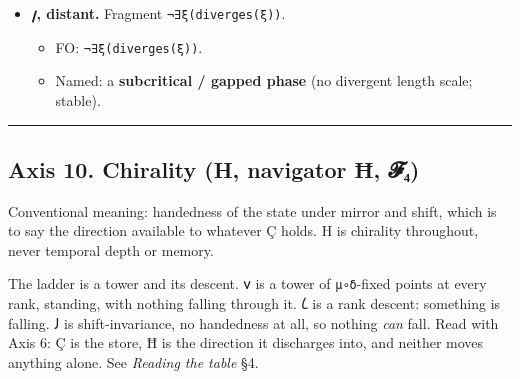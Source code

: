 \documentclass[12pt,a4paper]{article}
\begin{document}
\begin{itemize}
  \begin{itemize}
  \tightlist
  \item
    FO: \texttt{ξ\ →\ ∞\ ∧\ chaotic(x)}.
  \item
    Named: \textbf{divergence into chaos} (unbounded correlation without
    a fixed point; supercritical runaway).
  \end{itemize}
\item
  \textbf{𐑢, distant.} Fragment \texttt{¬∃ξ(diverges(ξ))}.

  \begin{itemize}
  \tightlist
  \item
    FO: \texttt{¬∃ξ(diverges(ξ))}.
  \item
    Named: a \textbf{subcritical / gapped phase} (no divergent length
    scale; stable).
  \end{itemize}
\end{itemize}

\begin{center}\rule{0.5\linewidth}{0.5pt}\end{center}

\hypertarget{axis-10.-chirality-h-navigator-ux127-ux1d4d5ux2084}{%
\subsection{Axis 10. Chirality (H, navigator Ħ,
𝓕₄)}\label{axis-10.-chirality-h-navigator-ux127-ux1d4d5ux2084}}

Conventional meaning: handedness of the state under mirror and shift,
which is to say the direction available to whatever Ç holds. H is
chirality throughout, never temporal depth or memory.

The ladder is a tower and its descent. 𐑫 is a tower of
\texttt{μ∘δ}-fixed points at every rank, standing, with nothing falling
through it. 𐑖 is a rank descent: something is falling. 𐑓 is
shift-invariance, no handedness at all, so nothing \emph{can} fall. Read
with Axis 6: Ç is the store, Ħ is the direction it discharges into, and
neither moves anything alone. See \emph{Reading the table} §4.
\end{document}
